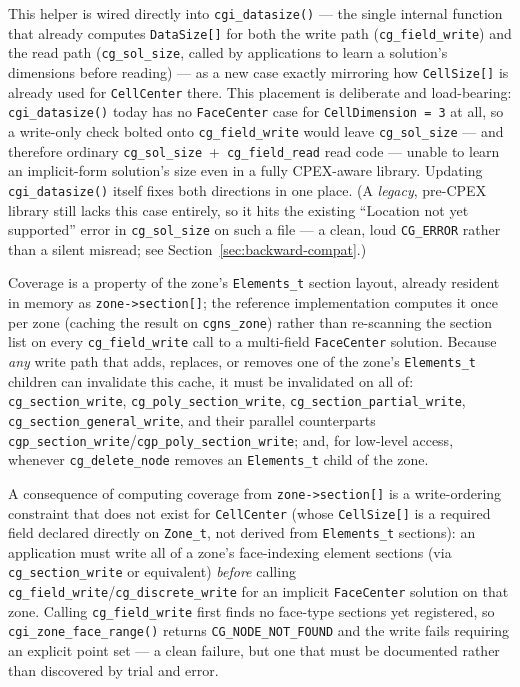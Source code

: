 \documentclass[11pt,letterpaper]{article}
\begin{document}
This helper is wired directly into \texttt{cgi\_datasize()} --- the single
internal function that already computes \texttt{DataSize[]} for both the
write path (\texttt{cg\_field\_write}) and the read path
(\texttt{cg\_sol\_size}, called by applications to learn a solution's
dimensions before reading) --- as a new case exactly mirroring how
\texttt{CellSize[]} is already used for \texttt{CellCenter} there. This
placement is deliberate and load-bearing: \texttt{cgi\_datasize()} today
has no \texttt{FaceCenter} case for \texttt{CellDimension~=~3} at all, so
a write-only check bolted onto \texttt{cg\_field\_write} would leave
\texttt{cg\_sol\_size} --- and therefore ordinary
\texttt{cg\_sol\_size}~+~\texttt{cg\_field\_read} read code --- unable to
learn an implicit-form solution's size even in a fully CPEX-aware
library. Updating \texttt{cgi\_datasize()} itself fixes both directions
in one place. (A \emph{legacy}, pre-CPEX library still lacks this case
entirely, so it hits the existing ``Location not yet supported'' error
in \texttt{cg\_sol\_size} on such a file --- a clean, loud
\texttt{CG\_ERROR} rather than a silent misread; see
Section~\ref{sec:backward-compat}.)

Coverage is a property of the zone's \texttt{Elements\_t} section layout,
already resident in memory as \texttt{zone->section[]}; the reference
implementation computes it once per zone (caching the result on
\texttt{cgns\_zone}) rather than re-scanning the section list on every
\texttt{cg\_field\_write} call to a multi-field \texttt{FaceCenter}
solution. Because \emph{any} write path that adds, replaces, or removes
one of the zone's \texttt{Elements\_t} children can invalidate this
cache, it must be invalidated on all of: \texttt{cg\_section\_write},
\texttt{cg\_poly\_section\_write}, \texttt{cg\_section\_partial\_write},
\texttt{cg\_section\_general\_write}, and their parallel counterparts
\texttt{cgp\_section\_write}/\texttt{cgp\_poly\_section\_write}; and,
for low-level access, whenever \texttt{cg\_delete\_node} removes an
\texttt{Elements\_t} child of the zone.

A consequence of computing coverage from \texttt{zone->section[]} is a
write-ordering constraint that does not exist for \texttt{CellCenter}
(whose \texttt{CellSize[]} is a required field declared directly on
\texttt{Zone\_t}, not derived from \texttt{Elements\_t} sections): an
application must write all of a zone's face-indexing element sections
(via \texttt{cg\_section\_write} or equivalent) \emph{before} calling
\texttt{cg\_field\_write}/\texttt{cg\_discrete\_write} for an implicit
\texttt{FaceCenter} solution on that zone. Calling
\texttt{cg\_field\_write} first finds no face-type sections yet
registered, so \texttt{cgi\_zone\_face\_range()} returns
\texttt{CG\_NODE\_NOT\_FOUND} and the write fails requiring an explicit
point set --- a clean failure, but one that must be documented rather
than discovered by trial and error.
\end{document}
